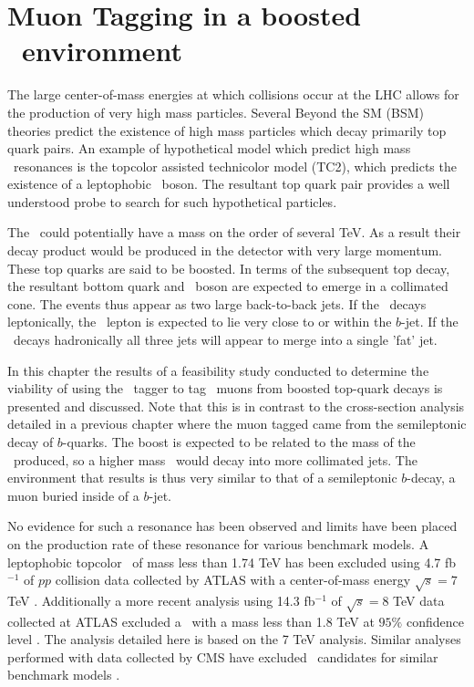 
\chapter{Muon Tagging in a boosted \ttbar\ environment} \label{sec:boosted_study}

The large center-of-mass energies at which collisions occur at the LHC allows for the production of very high mass particles. Several Beyond the SM (BSM) theories predict the existence of high mass particles which decay primarily top quark pairs.
An example of hypothetical model which predict high mass \ttbar\ resonances is the topcolor assisted technicolor model (TC2), which predicts the existence of a leptophobic \Zprime\ boson. The resultant top quark pair provides a well understood probe to search for such hypothetical particles. 

The \Zprime\ could potentially have a mass on the order of several TeV. As a result their decay product would be produced in the detector with very large momentum. These top quarks are said to be boosted. In terms of the subsequent top decay, the resultant bottom quark and \W\ boson are expected to emerge in a collimated cone. The events thus appear as two large back-to-back jets. If the \W\ decays leptonically, the \W\ lepton is expected to lie very close to or within the $b$-jet. If the \W\ decays hadronically all three jets will appear to merge into a single 'fat' jet.

In this chapter the results of a feasibility study conducted to determine the viability of using the \xsm\ tagger to tag \W\ muons from boosted top-quark decays is presented and discussed. Note that this is in contrast to the cross-section analysis detailed in a previous chapter where the muon tagged came from the semileptonic decay of $b$-quarks. The boost is expected to be related to the mass of the \Zprime\ produced, so a higher mass \Zprime\ would decay into more collimated jets. The environment that results is thus very similar to that of a semileptonic $b$-decay, a muon buried inside of a $b$-jet.

No evidence for such a resonance has been observed and limits have been placed on the production rate of these resonance for various benchmark models. A leptophobic topcolor \Zprime\ of mass less than 1.74 TeV has been excluded using 4.7 fb$^{-1}$ of $pp$ collision data collected by ATLAS with a center-of-mass energy $\sqrt{s}=7$ TeV \cite{Boosted:ATLASExclusion7TeV}. Additionally a more recent analysis using 14.3 fb$^{-1}$ of $\sqrt{s}=8$ TeV data collected at ATLAS excluded a \Zprime\ with a mass less than 1.8 TeV at $95\%$ confidence level \cite{Boosted:ATLASExclusion8TeV}.  The analysis detailed here is based on the 7 TeV analysis. Similar analyses performed with data collected by CMS have excluded \Zprime\ candidates for similar benchmark models \cite{Boosted:CMSSearch7TeVDilepton,Boosted:CMSSearchAnomalous,Boosted:CMSSearch8TeV}. 

